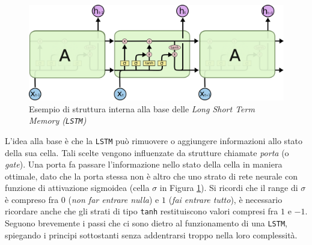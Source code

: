 \documentclass[twoside,twocolumn,10pt]{extarticle}
\theoremstyle{definition}
\begin{document}
		\begin{figure}[h]
			\centering
			\includegraphics[scale=.5]{img/lstm.png}
			\caption{Esempio di struttura interna alla base delle \textit{Long Short Term Memory (\texttt{LSTM})}}
			\label{fig:lstm}
		\end{figure}
	
		L'idea alla base è che la \texttt{LSTM} può rimuovere o aggiungere informazioni allo stato della sua cella. Tali scelte vengono influenzate da strutture chiamate \textit{porta} (o \textit{gate}). Una porta fa passare l'informazione nello stato della cella in maniera ottimale, dato che la porta stessa non è altro che uno strato di rete neurale con funzione di attivazione sigmoidea (cella $\sigma$ in Figura \ref{fig:lstm}). Si ricordi che il range di $\sigma$ è compreso fra $0$ (\textit{non far entrare nulla}) e $1$ (\textit{fai entrare tutto}), è necessario ricordare anche che gli strati di tipo \texttt{tanh} restituiscono valori compresi fra $1$ e $-1$. Seguono brevemente i passi che ci sono dietro al funzionamento di una \texttt{LSTM}, spiegando i principi sottostanti senza addentrarsi troppo nella loro complessità.
	
\end{document}
